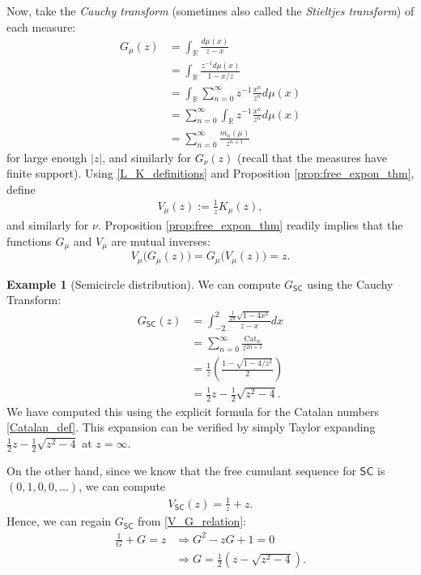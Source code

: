 \documentclass[letterpaper,11pt,oneside,reqno]{amsart}
\numberwithin{equation}{section}
\newcommand{\SC}{\mathsf{SC}}
\theoremstyle{definition}
\newtheorem{example}[proposition]{Example}
\begin{document}
Now, take the \emph{Cauchy transform} (sometimes also called the \emph{Stieltjes transform}) of each measure:
\begin{align*}
    G_\mu(z)&=\int_\mathbb{R} \frac{d\mu(x)}{z-x}\\
    &=\int_\mathbb{R} \frac{z^{-1} d\mu(x)}{1-x/z}\\
    &=\int_\mathbb{R}\sum_{n=0}^\infty z^{-1}\frac{x^n}{z^n} d\mu(x)\\
    &=\sum_{n=0}^\infty \int_\mathbb{R}z^{-1}\frac{x^n}{z^n} d\mu(x)\\
    &=\sum_{n=0}^\infty \frac{m_n(\mu)}{z^{n+1}}
\end{align*}
for large enough $|z|$, and similarly for $G_\nu(z)$
(recall that the measures have finite support).
Using \eqref{L_K_definitions} and Proposition \ref{prop:free_expon_thm},
define
\begin{align*}
    V_{\mu}(z):=\frac{1}{z}K_{\mu}(z),
\end{align*}
and similarly for $\nu$. 
Proposition \ref{prop:free_expon_thm} readily implies that
the functions $G_\mu$ and $V_\mu$ are mutual inverses:
\begin{equation}\label{V_G_relation}
	V_\mu\big(G_\mu(z)\big)=G_\mu\big(V_\mu(z)\big)=z.
\end{equation}

\begin{example}[Semicircle distribution]\label{G_SC}
We can compute $G_{\SC}$ using the Cauchy Transform:
\begin{align*}
G_{\SC}(z)&=\int_{-2}^2 \frac{\frac{1}{2\pi}\sqrt{1-4x^2}}{z-x}dx\\
&=\sum_{n=0}^\infty \frac{\mathrm{Cat}_n}{z^{2n+1}}\\
&=\frac{1}{z}\left(\frac{1-\sqrt{1-4/z^2}}{2}\right)\\
&=\frac{1}{2}z-\frac{1}{2}\sqrt{z^2-4}.
\end{align*}
We have computed this using the explicit formula for the Catalan numbers \eqref{Catalan_def}. This expansion can be 
verified by simply Taylor expanding $\frac{1}{2}z-\frac{1}{2}\sqrt{z^2-4}$ at $z=\infty$.

On the other hand, since we know that the free cumulant sequence for $\SC$ is $(0,1,0,0,...)$, we can compute
\begin{align*}
V_{\SC}(z)=\frac{1}{z}+z.
\end{align*}
Hence, we can regain $G_{\SC}$ from \eqref{V_G_relation}:
\begin{align*}
    \frac{1}{G}+G=z & \Rightarrow G^2-zG+1=0\\
    & \Rightarrow G=\frac{1}{2}(z-\sqrt{z^2-4}).
\end{align*}
\end{example}
\end{document}
